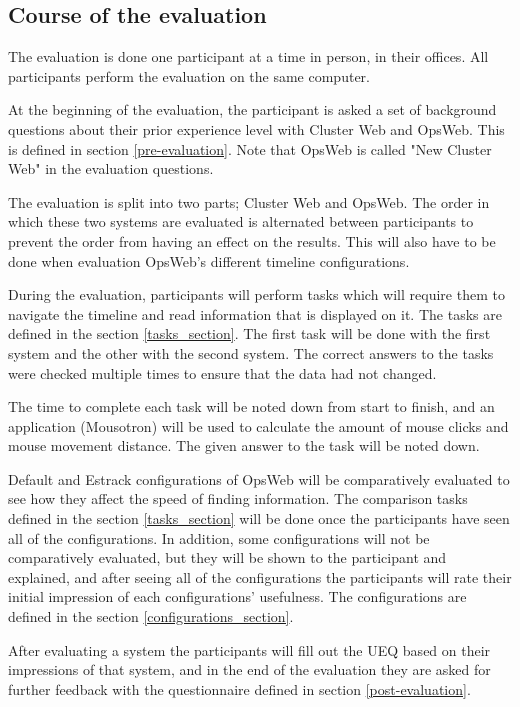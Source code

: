 \subsection{Course of the evaluation}
The evaluation is done one participant at a time in person, in their offices. All participants perform the evaluation on the same computer.

At the beginning of the evaluation, the participant is asked a set of background questions about their prior experience level with Cluster Web and OpsWeb. This is defined in section \ref{pre-evaluation}. Note that OpsWeb is called "New Cluster Web" in the evaluation questions.

The evaluation is split into two parts; Cluster Web and OpsWeb. The order in which these two systems are evaluated is alternated between participants to prevent the order from having an effect on the results. This will also have to be done when evaluation OpsWeb's different timeline configurations.

During the evaluation, participants will perform tasks which will require them to navigate the timeline and read information that is displayed on it. The tasks are defined in the section \ref{tasks_section}. The first task will be done with the first system and the other with the second system. The correct answers to the tasks were checked multiple times to ensure that the data had not changed.

The time to complete each task will be noted down from start to finish, and an application (Mousotron) \cite{mousotron} will be used to calculate the amount of mouse clicks and mouse movement distance. The given answer to the task will be noted down.

Default and Estrack configurations of OpsWeb will be comparatively evaluated to see how they affect the speed of finding information. The comparison tasks defined in the section \ref{tasks_section} will be done once the participants have seen all of the configurations. In addition, some configurations will not be comparatively evaluated, but they will be shown to the participant and explained, and after seeing all of the configurations the participants will rate their initial impression of each configurations' usefulness. The configurations are defined in the section \ref{configurations_section}.

 After evaluating a system the participants will fill out the UEQ based on their impressions of that system, and in the end of the evaluation they are asked for further feedback with the questionnaire defined in section \ref{post-evaluation}.

